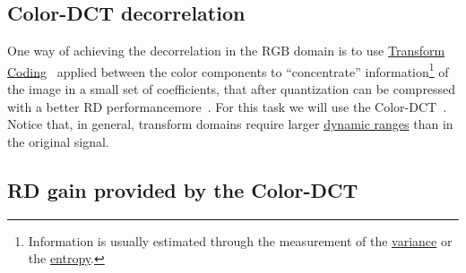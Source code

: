 \subsection{Color-DCT decorrelation}

One way of achieving the decorrelation in the $\text{RGB}$ domain is
to use
\href{https://vicente-gonzalez-ruiz.github.io/transform_coding/}{Transform
  Coding}~\cite{vruiz__transform_coding} applied between the color
components to ``concentrate'' information\footnote{Information is
usually estimated through the measurement of the
\href{https://en.wikipedia.org/wiki/Variance}{variance} or the
\href{https://en.wikipedia.org/wiki/Entropy}{entropy}.} of the image
in a small set of coefficients, that after quantization can be
compressed with a better RD
performancemore~\cite{vruiz__information_theory}. For this task we
will use the Color-DCT~\cite{vruiz__color_DCT}. Notice that, in
general, transform domains require larger
\href{https://en.wikipedia.org/wiki/Dynamic_range}{dynamic ranges}
than in the original signal.





\subsection{RD gain provided by the Color-DCT}

